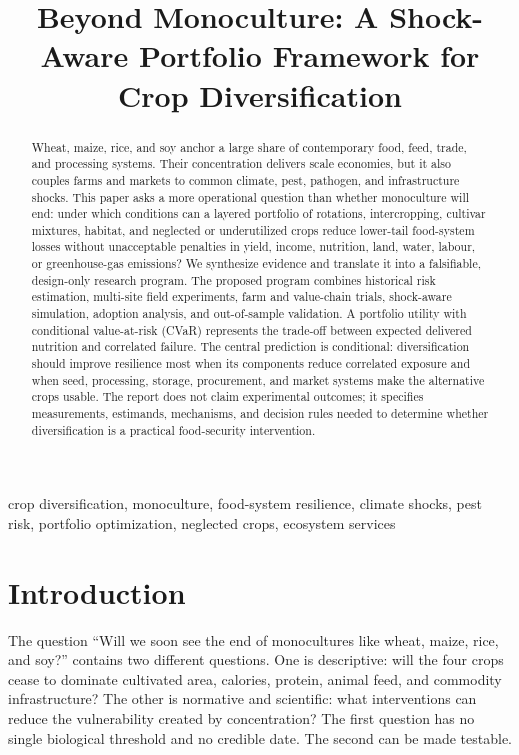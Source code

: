 \documentclass[conference]{IEEEtran}
\title{Beyond Monoculture: A Shock-Aware Portfolio Framework for Crop Diversification}
\author{\IEEEauthorblockN{Research Design Report}\IEEEauthorblockA{Four-Agent Scientific Workflow: Survey--Idea--ExperimentDesign--Author}}
\begin{document}
\maketitle
\begin{abstract}
Wheat, maize, rice, and soy anchor a large share of contemporary food, feed, trade, and processing systems. Their concentration delivers scale economies, but it also couples farms and markets to common climate, pest, pathogen, and infrastructure shocks. This paper asks a more operational question than whether monoculture will end: under which conditions can a layered portfolio of rotations, intercropping, cultivar mixtures, habitat, and neglected or underutilized crops reduce lower-tail food-system losses without unacceptable penalties in yield, income, nutrition, land, water, labour, or greenhouse-gas emissions? We synthesize evidence and translate it into a falsifiable, design-only research program. The proposed program combines historical risk estimation, multi-site field experiments, farm and value-chain trials, shock-aware simulation, adoption analysis, and out-of-sample validation. A portfolio utility with conditional value-at-risk (CVaR) represents the trade-off between expected delivered nutrition and correlated failure. The central prediction is conditional: diversification should improve resilience most when its components reduce correlated exposure and when seed, processing, storage, procurement, and market systems make the alternative crops usable. The report does not claim experimental outcomes; it specifies measurements, estimands, mechanisms, and decision rules needed to determine whether diversification is a practical food-security intervention.
\end{abstract}
\begin{IEEEkeywords}
crop diversification, monoculture, food-system resilience, climate shocks, pest risk, portfolio optimization, neglected crops, ecosystem services
\end{IEEEkeywords}

\section{Introduction}
\label{sec:intro}
The question ``Will we soon see the end of monocultures like wheat, maize, rice, and soy?'' contains two different questions. One is descriptive: will the four crops cease to dominate cultivated area, calories, protein, animal feed, and commodity infrastructure? The other is normative and scientific: what interventions can reduce the vulnerability created by concentration? The first question has no single biological threshold and no credible date. The second can be made testable.
\end{document}
